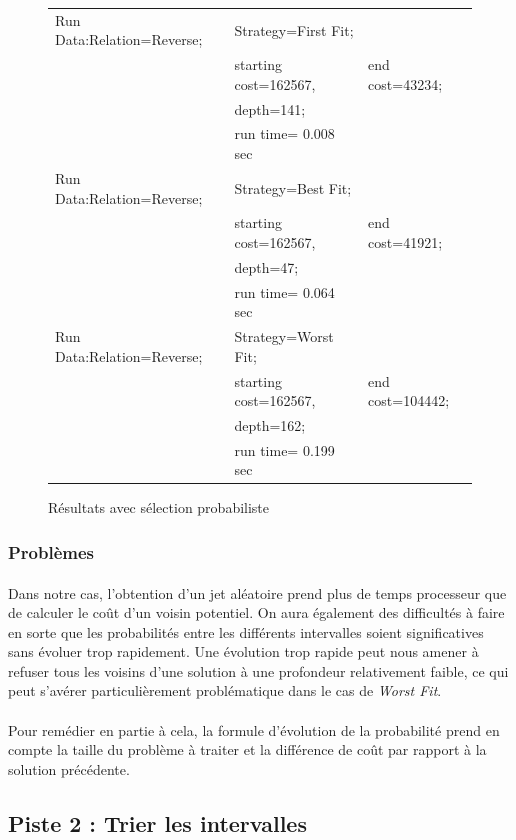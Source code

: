 \documentclass[a4paper,10pt]{report}
\begin{document}
\begin{figure}[h]
 \begin{tabular}{lll}
  Run Data:Relation=Reverse;&
    Strategy=First Fit;\\
    &starting cost=162567,&
    end cost=43234;\\
    &depth=141;\\
    &run time= 0.008 sec\\
  Run Data:Relation=Reverse;&
    Strategy=Best Fit;\\
    &starting cost=162567,&
    end cost=41921;\\
    &depth=47;\\
    &run time= 0.064 sec\\
  Run Data:Relation=Reverse;&
    Strategy=Worst Fit;\\
    &starting cost=162567,&
    end cost=104442;\\
    &depth=162;\\
    &run time= 0.199 sec\\
 \end{tabular}
 \caption{Résultats avec sélection probabiliste}
\end{figure}


\subsubsection{Problèmes}

\paragraph{}
  Dans notre cas, l'obtention d'un jet aléatoire prend plus de temps processeur
que de calculer le coût d'un voisin potentiel. On aura également des difficultés
à faire en sorte que les probabilités entre les différents intervalles soient
significatives sans évoluer trop rapidement. Une évolution trop rapide peut nous
amener à refuser tous les voisins d'une solution à une profondeur relativement
faible, ce qui peut s'avérer particulièrement problématique dans le cas de
\textit{Worst Fit}.
\paragraph{}
  Pour remédier en partie à cela, la formule d'évolution de la probabilité prend
en compte la taille du problème à traiter et la différence de coût par rapport à
la solution précédente.


\subsection{Piste 2 : Trier les intervalles}
\end{document}
